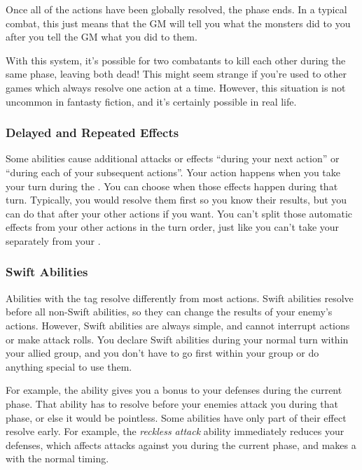     Once all of the actions have been globally resolved, the phase ends.
    In a typical combat, this just means that the GM will tell you what the monsters did to you after you tell the GM what you did to them.

    With this system, it's possible for two combatants to kill each other during the same phase, leaving both dead!
    This might seem strange if you're used to other games which always resolve one action at a time.
    However, this situation is not uncommon in fantasty fiction, and it's certainly possible in real life.

    \subsubsection{Delayed and Repeated Effects}
      Some abilities cause additional attacks or effects ``during your next action'' or ``during each of your subsequent actions''.
      Your action happens when you take your turn during the .
      You can choose when those effects happen during that turn.
      Typically, you would resolve them first so you know their results, but you can do that after your other actions if you want.
      You can't split those automatic effects from your other actions in the turn order, just like you can't take your  separately from your .

    \subsubsection{Swift Abilities}\label{Swift Abilities}
      Abilities with the  tag resolve differently from most actions.
      Swift abilities resolve before all non-Swift abilities, so they can change the results of your enemy's actions.
      However, Swift abilities are always simple, and cannot interrupt actions or make attack rolls.
      You declare Swift abilities during your normal turn within your allied group, and you don't have to go first within your group or do anything special to use them.

      For example, the  ability gives you a bonus to your defenses during the current phase.
      That ability has to resolve before your enemies attack you during that phase, or else it would be pointless.
      Some abilities have only part of their effect resolve early.
      For example, the \textit{reckless attack} ability immediately reduces your defenses, which affects attacks against you during the current phase, and makes a  with the normal timing.

